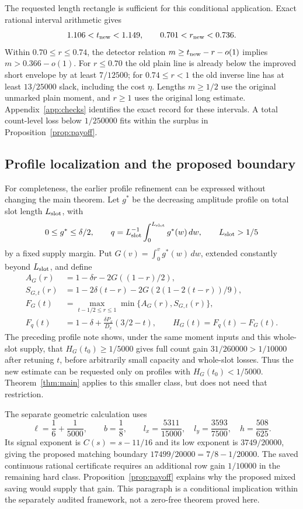\documentclass[11pt]{article}
\theoremstyle{definition}
\theoremstyle{remark}
\numberwithin{equation}{section}
\begin{document}
The requested length rectangle is sufficient for this conditional
application. Exact rational interval arithmetic gives
\[
1.106<t_{\rm new}<1.149,\qquad
0.701<r_{\rm new}<0.736.
\]
Within $0.70\le r\le0.74$, the detector relation
$m\ge t_{\rm new}-r-o(1)$ implies $m>0.366-o(1)$.
For $r\le0.70$ the old plain line is already below the improved
short envelope by at least $7/12500$; for
$0.74\le r<1$ the old inverse line has at least $13/25000$ slack,
including the cost $\eta$. Lengths $m\ge1/2$ use the original
unmarked plain moment, and $r\ge1$ uses the original long estimate.
Appendix~\ref{app:checks} identifies the exact record for these
intervals. A total count-level loss below $1/250000$ fits within
the surplus in Proposition~\ref{prop:payoff}.

\subsection{Profile localization and the proposed boundary}

For completeness, the earlier profile refinement can be expressed
without changing the main theorem. Let $g^*$ be the decreasing
amplitude profile on total slot length $L_{\rm slot}$, with
\[
0\le g^*\le\delta/2,\qquad
q=L_{\rm slot}^{-1}\int_0^{L_{\rm slot}}g^*(w)\,dw,
\qquad L_{\rm slot}>1/5
\]
by a fixed supply margin. Put $G(v)=\int_0^v g^*(w)\,dw$, extended
constantly beyond $L_{\rm slot}$, and define
\begin{align*}
A_G(r)&=1-\delta r-2G((1-r)/2),\\
S_{G,t}(r)&=1-2\delta(t-r)-2G(2(1-2(t-r))/9),\\
F_G(t)&=\max_{t-1/2\le r\le1}\min\{A_G(r),S_{G,t}(r)\},\\
F_q(t)&=1-\delta+\frac{\delta P_x}{D_x}(3/2-t),\qquad
H_G(t)=F_q(t)-F_G(t).
\end{align*}
The preceding profile note \cite{records} shows, under the same
moment inputs and this whole-slot supply, that
$H_G(t_0)\ge1/5000$ gives full count gain
$31/260000>1/10000$ after retuning $t$, before arbitrarily small
capacity and whole-slot losses. Thus the new estimate can
be requested only on profiles with $H_G(t_0)<1/5000$.
Theorem~\ref{thm:main} applies to this smaller class, but does not
need that restriction.

The separate geometric calculation uses
\[
\ell=\frac16+\frac1{5000},\qquad b=\frac18,\qquad
l_x=\frac{5311}{15000},\quad l_y=\frac{3593}{7500},
\quad h=\frac{508}{625}.
\]
Its signal exponent is $C(s)=s-11/16$ and its low exponent is
$3749/20000$, giving the proposed matching boundary
$17499/20000=7/8-1/20000$. The saved continuous rational certificate
requires an additional row gain $1/10000$ in the remaining hard class.
Proposition~\ref{prop:payoff} explains why the proposed mixed saving
would supply that gain. This paragraph is a conditional implication
within the separately audited framework, not a zero-free theorem
proved here.
\end{document}
